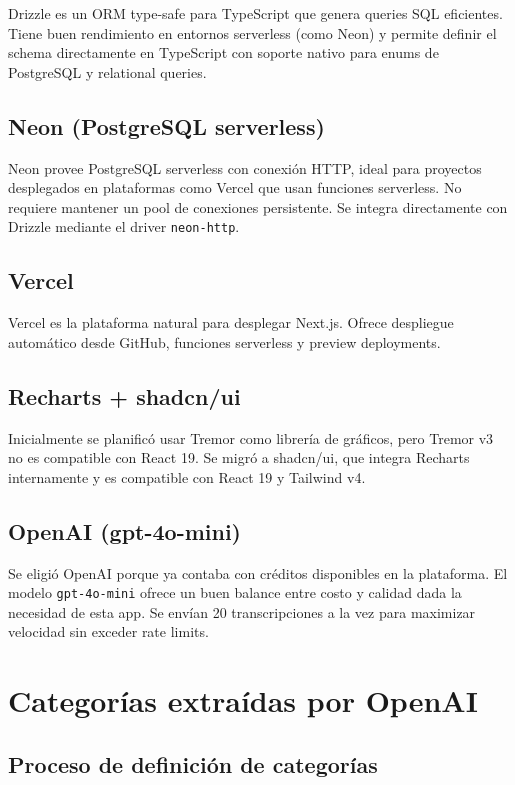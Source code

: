 \documentclass[11pt,a4paper]{article}
\begin{document}
Drizzle es un ORM type-safe para TypeScript que genera queries SQL eficientes. Tiene buen rendimiento en entornos serverless (como Neon) y permite definir el schema directamente en TypeScript con soporte nativo para enums de PostgreSQL y relational queries.

\subsection{Neon (PostgreSQL serverless)}

Neon provee PostgreSQL serverless con conexión HTTP, ideal para proyectos desplegados en plataformas como Vercel que usan funciones serverless. No requiere mantener un pool de conexiones persistente. Se integra directamente con Drizzle mediante el driver \texttt{neon-http}.

\subsection{Vercel}

Vercel es la plataforma natural para desplegar Next.js. Ofrece despliegue automático desde GitHub, funciones serverless y preview deployments.

\subsection{Recharts + shadcn/ui}

Inicialmente se planificó usar Tremor como librería de gráficos, pero Tremor v3 no es compatible con React 19. Se migró a shadcn/ui, que integra Recharts internamente y es compatible con React 19 y Tailwind v4.

\subsection{OpenAI (gpt-4o-mini)}

Se eligió OpenAI porque ya contaba con créditos disponibles en la plataforma. El modelo \texttt{gpt-4o-mini} ofrece un buen balance entre costo y calidad dada la necesidad de esta app. Se envían 20 transcripciones a la vez para maximizar velocidad sin exceder rate limits.

\section{Categorías extraídas por OpenAI}

\subsection{Proceso de definición de categorías}
\end{document}
